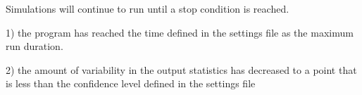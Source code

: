 Simulations will continue to run until a stop condition is reached.

1) the program has reached the time defined in the settings file as the maximum run duration.

2) the amount of variability in the output statistics has decreased to a point that is less than the confidence level defined in the settings file 